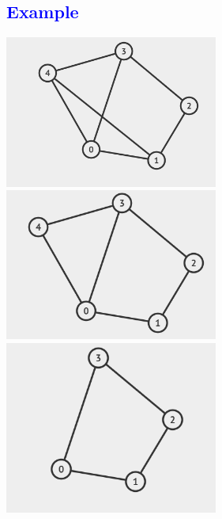 \documentclass[11pt,a4paper]{article}
\begin{document}
\subsection*{\textcolor{blue}{\Large Example }}
\includegraphics[width=70mm]{example3 (3).png}
\\
\includegraphics[width=70mm]{example3 (2).png}
\\
\includegraphics[width=70mm]{example3 (1).png}
\end{document}
